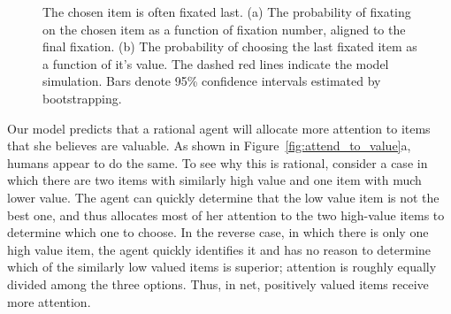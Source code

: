 \documentclass[12pt,a4paperpaper,]{article}
\begin{document}
\begin{figure}[t!]
  \centering
  \caption{The chosen item is often fixated last.
    (a) The probability of fixating on the chosen item as a function of fixation number, aligned to the final fixation.
    (b) The probability of choosing the last fixated item as a function of it's value.
    The dashed red lines indicate the model simulation. Bars denote 95\% confidence intervals estimated by bootstrapping.
  }
  \label{fig:choose_last}
\end{figure}

Our model predicts that a rational agent will allocate more attention to items that she believes are valuable. As shown in Figure~\ref{fig:attend_to_value}a, humans appear to do the same. To see why this is rational, consider a case in which there are two items with similarly high value and one item with much lower value. The agent can quickly determine that the low value item is not the best one, and thus allocates most of her attention to the two high-value items to determine which one to choose. In the reverse case, in which there is only one high value item, the agent quickly identifies it and has no reason to determine which of the similarly low valued items is superior; attention is roughly equally divided among the three options. Thus, in net, positively valued items receive more attention.
\end{document}
